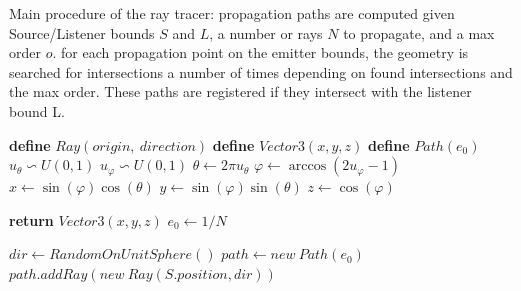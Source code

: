 \begin{algorithm}
  \caption[Main procedure of the ray tracer: computed propagation paths given source-listener position pairs]{Main procedure of the ray tracer: propagation paths are computed given Source/Listener bounds $S$ and $L$, a number or rays $N$ to propagate, and a max order $o$. for each propagation point on the emitter bounds, the geometry is searched for intersections a number of times depending on found intersections and the max order. These paths are registered if they intersect with the listener bound L.}\label{alg:rt-main}
  \begin{algorithmic}[1]
    \State{} \textbf{define} $Ray(origin,~direction)$
    \State{} \textbf{define} {$Vector3(x,y,z)$}
    \State{} \textbf{define} {$Path(e_0)$}
        \State{} $u_{\theta} \backsim U(0, 1)$
        \State{} $u_{\varphi} \backsim U(0, 1)$ 
        \State{} $\theta \gets 2 \pi u_{\theta}$
        \State{} $\varphi \gets \arccos(2 u_{\varphi} - 1)$  
        \State{} $x \gets \sin(\varphi) \cos(\theta)$ 
        \State{} $y \gets \sin(\varphi) \sin(\theta)$
        \State{} $z \gets \cos(\varphi)$

        \State{} \textbf{return} $Vector3(x, y, z)$
    \EndFunction{}
      \State{} $e_0\gets 1 / N$

          \State{} $dir \gets RandomOnUnitSphere()$
          \State{} $path \gets new~Path(e_0)$
          \State{} $path.addRay(new~Ray(S.position, dir))$
          

\end{algorithmic}
\end{algorithm}

